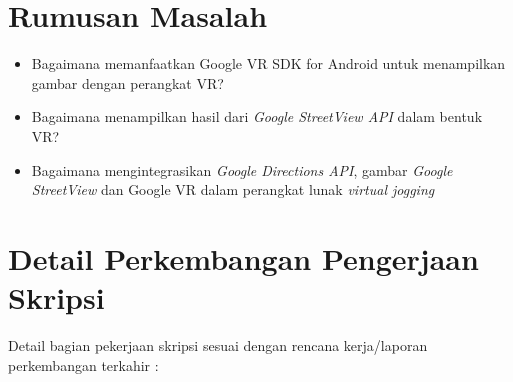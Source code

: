\documentclass[a4paper,twoside]{article}
\begin{document}
\section{Rumusan Masalah}
\begin{itemize}
	\item Bagaimana memanfaatkan Google VR SDK for Android untuk menampilkan gambar dengan perangkat VR?
	\item Bagaimana menampilkan hasil dari \textit{Google StreetView API} dalam bentuk VR?
	\item Bagaimana mengintegrasikan \textit{Google Directions API}, gambar \textit{Google StreetView}  dan Google VR dalam perangkat lunak \textit{virtual jogging}
\end{itemize}

\section{Detail Perkembangan Pengerjaan Skripsi}
Detail bagian pekerjaan skripsi sesuai dengan rencana kerja/laporan perkembangan terkahir :
\end{document}
